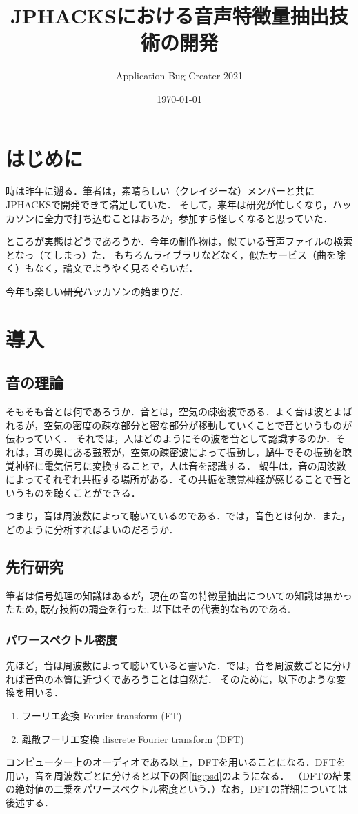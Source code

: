 \documentclass[uplatex,a4paper,11pt]{jsarticle}
\begin{document}
\title{JPHACKSにおける音声特徴量抽出技術の開発}
\author{Application Bug Creater 2021}
\date{\today}
\maketitle

\section{はじめに}
時は昨年に遡る．筆者は，素晴らしい（クレイジーな）メンバーと共にJPHACKSで開発できて満足していた．
そして，来年は研究が忙しくなり，ハッカソンに全力で打ち込むことはおろか，参加すら怪しくなると思っていた．

ところが実態はどうであろうか．今年の制作物は，似ている音声ファイルの検索となっ（てしまっ）た．
もちろんライブラリなどなく，似たサービス（曲を除く）もなく，論文でようやく見るぐらいだ．

今年も楽しい\sout{研究}ハッカソンの始まりだ．

\section{導入}
\subsection{音の理論}
そもそも音とは何であろうか．音とは，空気の疎密波である．よく音は波とよばれるが，空気の密度の疎な部分と密な部分が移動していくことで音というものが伝わっていく．
それでは，人はどのようにその波を音として認識するのか．それは，耳の奥にある鼓膜が，空気の疎密波によって振動し，蝸牛でその振動を聴覚神経に電気信号に変換することで，人は音を認識する．
蝸牛は，音の周波数によってそれぞれ共振する場所がある．その共振を聴覚神経が感じることで音というものを聴くことができる．

つまり，音は周波数によって聴いているのである．では，音色とは何か．また，どのように分析すればよいのだろうか．

\subsection{先行研究}
筆者は信号処理の知識はあるが，現在の音の特徴量抽出についての知識は無かったため, 既存技術の調査を行った. 以下はその代表的なものである.

\subsubsection{パワースペクトル密度}
先ほど，音は周波数によって聴いていると書いた．では，音を周波数ごとに分ければ音色の本質に近づくであろうことは自然だ．
そのために，以下のような変換を用いる．
\begin{enumerate}
  \item フーリエ変換 Fourier transform (FT)
  \item 離散フーリエ変換 discrete Fourier transform (DFT)
\end{enumerate}
コンピューター上のオーディオである以上，DFTを用いることになる．DFTを用い，音を周波数ごとに分けると以下の図\ref{fig:psd}のようになる．
（DFTの結果の絶対値の二乗をパワースペクトル密度という．）なお，DFTの詳細については後述する．
\end{document}

